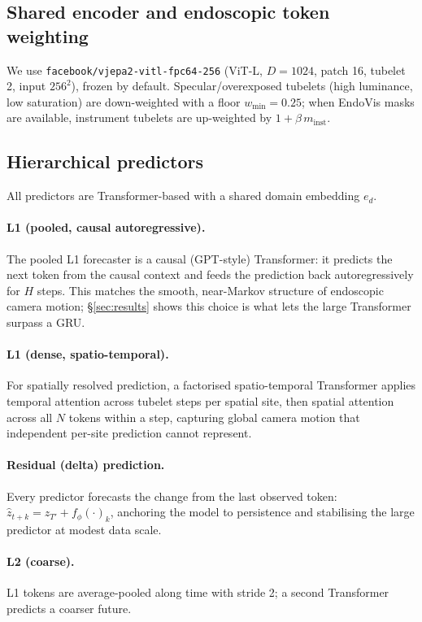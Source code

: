 \documentclass[final,3p,times,twocolumn]{elsarticle}
\begin{document}
\subsection{Shared encoder and endoscopic token weighting}
We use \texttt{facebook/vjepa2-vitl-fpc64-256} (ViT-L, $D{=}1024$, patch 16, tubelet 2, input $256^2$), frozen by default. Specular/overexposed tubelets (high luminance, low saturation) are down-weighted with a floor $w_{\min}{=}0.25$; when EndoVis masks are available, instrument tubelets are up-weighted by $1+\beta\, m_{\mathrm{inst}}$.

\subsection{Hierarchical predictors}
All predictors are Transformer-based with a shared domain embedding $e_d$.

\paragraph{L1 (pooled, causal autoregressive).} The pooled L1 forecaster is a causal (GPT-style) Transformer: it predicts the next token from the causal context and feeds the prediction back autoregressively for $H$ steps. This matches the smooth, near-Markov structure of endoscopic camera motion; \S\ref{sec:results} shows this choice is what lets the large Transformer surpass a GRU.

\paragraph{L1 (dense, spatio-temporal).} For spatially resolved prediction, a factorised spatio-temporal Transformer applies temporal attention across tubelet steps per spatial site, then spatial attention across all $N$ tokens within a step, capturing global camera motion that independent per-site prediction cannot represent.

\paragraph{Residual (delta) prediction.} Every predictor forecasts the change from the last observed token: $\hat z_{t+k} = z_{T'} + f_\phi(\cdot)_k$, anchoring the model to persistence and stabilising the large predictor at modest data scale.

\paragraph{L2 (coarse).} L1 tokens are average-pooled along time with stride 2; a second Transformer predicts a coarser future.
\end{document}
